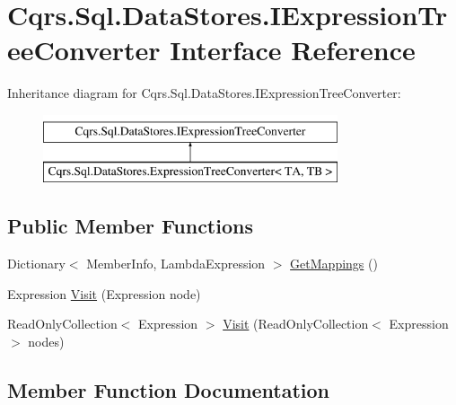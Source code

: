\hypertarget{interfaceCqrs_1_1Sql_1_1DataStores_1_1IExpressionTreeConverter}{}\section{Cqrs.\+Sql.\+Data\+Stores.\+I\+Expression\+Tree\+Converter Interface Reference}
\label{interfaceCqrs_1_1Sql_1_1DataStores_1_1IExpressionTreeConverter}
Inheritance diagram for Cqrs.\+Sql.\+Data\+Stores.\+I\+Expression\+Tree\+Converter\+:\begin{figure}[H]
\begin{center}
\leavevmode
\includegraphics[height=2.000000cm]{interfaceCqrs_1_1Sql_1_1DataStores_1_1IExpressionTreeConverter}
\end{center}
\end{figure}
\subsection*{Public Member Functions}
\begin{DoxyCompactItemize}
\item 
Dictionary$<$ Member\+Info, Lambda\+Expression $>$ \hyperlink{interfaceCqrs_1_1Sql_1_1DataStores_1_1IExpressionTreeConverter_ad48480ecf7056a2b2cc079006cc2a589_ad48480ecf7056a2b2cc079006cc2a589}{Get\+Mappings} ()
\item 
Expression \hyperlink{interfaceCqrs_1_1Sql_1_1DataStores_1_1IExpressionTreeConverter_ae5904ce74f9184703c51b58840770172_ae5904ce74f9184703c51b58840770172}{Visit} (Expression node)
\item 
Read\+Only\+Collection$<$ Expression $>$ \hyperlink{interfaceCqrs_1_1Sql_1_1DataStores_1_1IExpressionTreeConverter_a24431bb6665d6d9b617f244049190655_a24431bb6665d6d9b617f244049190655}{Visit} (Read\+Only\+Collection$<$ Expression $>$ nodes)
\end{DoxyCompactItemize}


\subsection{Member Function Documentation}
\mbox{\label{interfaceCqrs_1_1Sql_1_1DataStores_1_1IExpressionTreeConverter_ad48480ecf7056a2b2cc079006cc2a589_ad48480ecf7056a2b2cc079006cc2a589}} 
